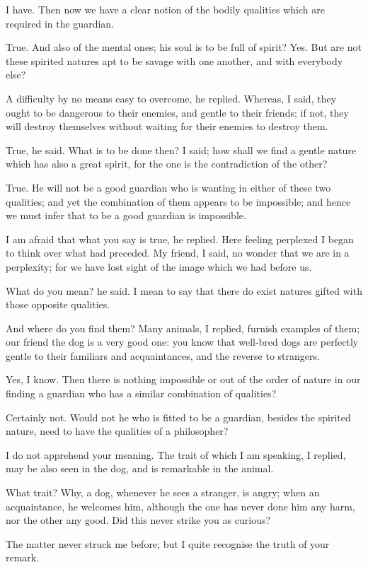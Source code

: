 I have.
Then now we have a clear notion of the bodily qualities which are required in the guardian.

True.
And also of the mental ones; his soul is to be full of spirit?
Yes.
But are not these spirited natures apt to be savage with one another, and with everybody else?

A difficulty by no means easy to overcome, he replied.
Whereas, I said, they ought to be dangerous to their enemies, and gentle to their friends; if not, they will destroy themselves without waiting for their enemies to destroy them.

True, he said.
What is to be done then? I said; how shall we find a gentle nature which has also a great spirit, for the one is the contradiction of the other?

True.
He will not be a good guardian who is wanting in either of these two qualities; and yet the combination of them appears to be impossible; and hence we must infer that to be a good guardian is impossible.

I am afraid that what you say is true, he replied.
Here feeling perplexed I began to think over what had preceded. My friend, I said, no wonder that we are in a perplexity; for we have lost sight of the image which we had before us.

What do you mean? he said.
I mean to say that there do exist natures gifted with those opposite qualities.

And where do you find them?
Many animals, I replied, furnish examples of them; our friend the dog is a very good one: you know that well-bred dogs are perfectly gentle to their familiars and acquaintances, and the reverse to strangers.

Yes, I know.
Then there is nothing impossible or out of the order of nature in our finding a guardian who has a similar combination of qualities?

Certainly not.
Would not he who is fitted to be a guardian, besides the spirited nature, need to have the qualities of a philosopher?

I do not apprehend your meaning.
The trait of which I am speaking, I replied, may be also seen in the dog, and is remarkable in the animal.

What trait?
Why, a dog, whenever he sees a stranger, is angry; when an acquaintance, he welcomes him, although the one has never done him any harm, nor the other any good. Did this never strike you as curious?

The matter never struck me before; but I quite recognise the truth of your remark.

